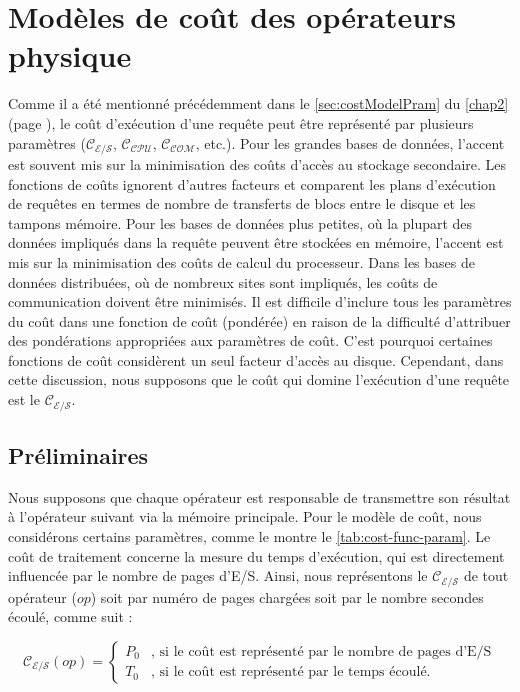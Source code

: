 \section{Modèles de coût des opérateurs physique}\label{sec:operatorsCostModel}
Comme il a été mentionné précédemment dans le \ref{sec:costModelPram} du \ref{chap2} (page \pageref{sec:costModelPram}), le coût d'exécution d'une requête peut être représenté par plusieurs paramètres ($\mathcal{C_{E/S}}$, $\mathcal{C_{CPU}}$, $\mathcal{C_{COM}}$, etc.). Pour les grandes bases de données, l'accent est souvent mis sur la minimisation des coûts d'accès au stockage secondaire. Les fonctions de coûts ignorent d'autres facteurs et comparent les plans d'exécution de requêtes en termes de nombre de transferts de blocs entre le disque et les tampons mémoire. Pour les bases de données plus petites, où la plupart des données impliqués dans la requête peuvent être stockées en mémoire, l'accent est mis sur la minimisation des coûts de calcul du processeur. Dans les bases de données distribuées, où de nombreux sites sont impliqués, les coûts de communication doivent être minimisés. Il est difficile d'inclure tous les paramètres du coût dans une fonction de coût (pondérée) en raison de la difficulté d'attribuer des pondérations appropriées aux paramètres de coût. C'est pourquoi certaines fonctions de coût considèrent un seul facteur d'accès au disque. Cependant, dans cette discussion, nous supposons que le coût qui domine l'exécution d'une requête est le $\mathcal{C_{E/S}}$.

\subsection{Préliminaires}
Nous supposons que chaque opérateur est responsable de transmettre son résultat à l'opérateur suivant via la mémoire principale.
Pour le modèle de coût, nous considérons certains paramètres, comme le montre le \ref{tab:cost-func-param}. Le coût de traitement concerne la mesure du temps d'exécution, qui est directement influencée par le nombre de pages d'E/S. Ainsi, nous représentons le $\mathcal{C_{E/S}}$ de tout opérateur ($op$) soit par numéro de pages chargées soit par le nombre secondes écoulé, comme suit :

\begin{equation}
 \mathcal{C_{E/S}}(op)  = \begin{cases}
  P_0 & \text{, si le coût est représenté par le nombre de pages d'E/S} \\
  T_0 & \text{, si le coût est représenté par le temps écoulé}.
\end{cases}
\end{equation}

